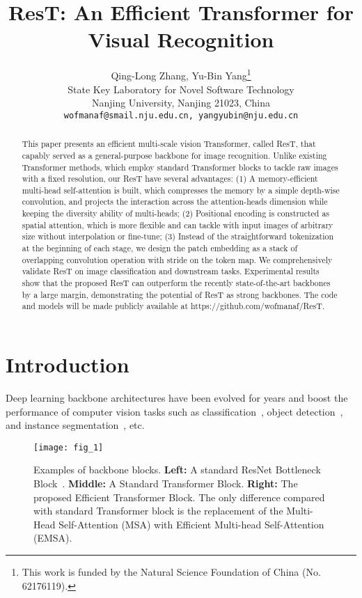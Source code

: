 \documentclass{article}
\title{ResT: An Efficient Transformer for Visual Recognition}
\author{Qing-Long Zhang, Yu-Bin Yang\thanks{This work is funded by the Natural Science Foundation of China (No. 62176119).} \\
  State Key Laboratory for Novel Software Technology\\
  Nanjing University, Nanjing 21023, China\\
  \texttt{wofmanaf@smail.nju.edu.cn, yangyubin@nju.edu.cn} \\
}
\begin{document}
\maketitle

\begin{abstract}
This paper presents an efficient multi-scale vision Transformer, called ResT, that capably served as a general-purpose backbone for image recognition. Unlike existing Transformer methods, which employ standard Transformer blocks to tackle raw images with a fixed resolution, our ResT have several advantages: (1) A memory-efficient multi-head self-attention is built, which compresses the memory by a simple depth-wise convolution, and projects the interaction across the attention-heads dimension while keeping the diversity ability of multi-heads; (2) Positional encoding is constructed as spatial attention, which is more flexible and can tackle with input images of arbitrary size without interpolation or fine-tune; (3) Instead of the straightforward tokenization at the beginning of each stage, we design the patch embedding as a stack of overlapping convolution operation with stride on the token map. We comprehensively validate ResT on image classification and downstream tasks. Experimental results show that the proposed ResT can outperform the recently state-of-the-art backbones by a large margin, demonstrating the potential of ResT as strong backbones. The code and models will be made publicly available at https://github.com/wofmanaf/ResT.
\end{abstract}

\section{Introduction}
\label{sec:intro}
Deep learning backbone architectures have been evolved for years and boost the performance of computer vision tasks such as classification~\cite{DBLP:journals/corr/abs-2010-11929,DBLP:journals/corr/abs-2012-12877,DBLP:journals/corr/abs-2101-11986,DBLP:conf/cvpr/HeZRS16}, object detection~\cite{DBLP:conf/eccv/CarionMSUKZ20,DBLP:journals/corr/abs-2010-04159,DBLP:conf/iccv/LinGGHD17,DBLP:journals/corr/abs-2006-09214}, and instance segmentation~\cite{DBLP:conf/iccv/HeGDG17,DBLP:conf/eccv/TianSC20,DBLP:journals/corr/abs-2003-10152}, etc.

\begin{figure}[htb]
	\begin{center}
		\texttt{[image: fig\_1]}
	\end{center}
	\caption{Examples of backbone blocks. \textbf{Left:} A standard ResNet Bottleneck Block~\cite{DBLP:conf/cvpr/HeZRS16}. \textbf{Middle:} A Standard Transformer Block. \textbf{Right:} The proposed Efficient Transformer Block. The only difference compared with standard Transformer block is the replacement of the Multi-Head Self-Attention (MSA) with Efficient Multi-head Self-Attention (EMSA).}
	\label{fig:figure1}
\end{figure}
\end{document}

